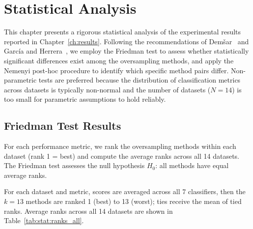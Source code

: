 
\chapter{Statistical Analysis}
\label{ch:statistical}

This chapter presents a rigorous statistical analysis of the experimental results reported in Chapter~\ref{ch:results}.
Following the recommendations of Dem\v{s}ar~\cite{demsar2006statistical} and Garc\'{i}a and Herrera~\cite{garcia2008extension}, we employ the Friedman test to assess whether statistically significant differences exist among the oversampling methods, and apply the Nemenyi post-hoc procedure to identify which specific method pairs differ.
Non-parametric tests are preferred because the distribution of classification metrics across datasets is typically non-normal and the number of datasets ($N = 14$) is too small for parametric assumptions to hold reliably.


\section{Friedman Test Results}
\label{sec:stat:friedman}

For each performance metric, we rank the oversampling methods within each dataset (rank 1 = best) and compute the average ranks across all 14 datasets.
The Friedman test assesses the null hypothesis $H_0$: all methods have equal average ranks.

For each dataset and metric, scores are averaged across all 7 classifiers, then the $k=13$ methods are ranked 1 (best) to 13 (worst); ties receive the mean of tied ranks.
Average ranks across all 14 datasets are shown in Table~\ref{tab:stat:ranks_all}.

